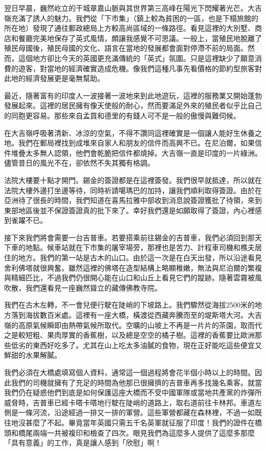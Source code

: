 翌日早晨，巍然屹立的干城章嘉山脈與其世界第三高峰在陽光下閃耀著光芒。大吉嶺充滿了誘人的魅力。我們從「下市集」（鎮上較為貧困的一區，也是下榻旅館的所在地）發現了通往郵政總局上方較高尚區域的一條路徑。看見這裡的大別墅、商店和餐廳完美地保存了英式風情，頗讓我感覺不可思議。一般上，當殖民地脫離了殖民母國後，殖民母國的文化、語言在當地的發展都會面對停滯不前的局面。然而，這個地方卻比今天的英國更充滿傳統的「英式」氛圍。只是這裡缺少了願意消費的遊客，對當地的經濟確實造成危機。像我們這種凡事先看價格的節約型旅客對此地的經濟發展更是毫無幫助。

最近，隨著富有的印度人一波接著一波地來到此地遊玩，這裡的服務業又開始蓬勃發展起來。這裡的居民擁有像天使般的耐心，然而要滿足外來的殖民者似乎比自己的同胞更容易。那些來自孟買和德里的有錢人可不是一般的傲慢與難伺候。

在大吉嶺呼吸著清新、冰涼的空氣，不得不讚同這裡確實是一個讓人能好生休養之地。我們在郵局裡找到成堆來自家人和朋友的信件而高興不已。在尼泊爾，如果信件堆疊太多無人認領，他們會乾脆把信件都燒掉。大吉嶺一直是印度的一片綠洲。儘管昔日的風光不在，卻依然不失其獨有格調。

法院大樓要十點才開門。錫金的簽證都是在這裡簽發。我們很早就抵達，所以就在法院大樓外邊打坐邊等待，同時祈請噶瑪巴的加持，讓我們順利取得簽證。由於在亞洲待了很長的時間，我們知道在喜馬拉雅中部收到消息說簽證獲批了待領，來到東部地區後並不保證簽證真的批下來了。幸好我們還是如願取得了簽證，內心裡感到雀躍不已。

接下來我們將會需要一台吉普車。若要搭乘前往錫金的吉普車，我們必須回到那天下車的地點。候車站就在下市集的屠宰場旁，那裡也是苦力、計程車司機和樵夫居住的地方。我們的第一站是古木的山口。由於這一次是在白天出發，所以沿途看見舍利佛塔就很興奮。雖然這裡的佛塔在造型結構上略顯稚嫩，無法與尼泊爾的繁複與精細匹比，不過我們仍很開心能在山口和山丘上看見它們的蹤跡。隨著雲霧被風吹散，我們還看見一座巍然聳立的藏傳佛教寺院。

我們在古木左轉，不一會兒便行駛在陡峭的下坡路上。我們驟然從海拔2500米的地方落到海拔數百米處。這裡有一座大橋，橫渡從西藏奔騰而至的堤斯塔大河。大吉嶺的高原氣候瞬即由熱帶氣候所取代。空曠的山坡上不再是一片片的茶園，取而代之是較短粗、果肉厚實的香蕉樹，以及總是空空的橘子樹。這裡的香蕉要比歐洲那些低劣的東西好吃多了。尤其在山上吃太多油膩的食物，現在正好能吃這些便宜又鮮甜的水果解膩。

我們必須在大橋處填寫個人資料，通常這一個過程將會花半個小時以上的時間。因此我們的司機就擁有了充足的時間為他那已很擁擠的吉普車再多找幾名乘客。就當我們仍在疑惑他們到底是如何保護這座大橋而不受中國軍隊或當地共產黨的炸彈所威脅時，吉普車已經卡嗒卡嗒地行駛在陡峭的道路上，取右道前往卡林邦。車道左側是一條河流，沿途經過一排又一排的軍營。這些軍營都藏在森林裡，不過一如既往地沒甚麼了不起。畢竟當年英國只需五千名英軍就征服了印度！我們的證件在橋頭和橋尾兩端一共被複印和檢查了四次。眼見我們為這麼多人提供了這麼多那麼「具有意義」的工作，真是讓人感到「欣慰」啊！

